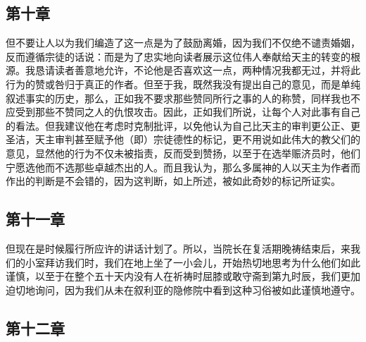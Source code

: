 
\subsection{第十章}

\par

但不要让人以为我们编造了这一点是为了鼓励离婚，因为我们不仅绝不谴责婚姻，反而遵循宗徒的话说：而是为了忠实地向读者展示这位伟人奉献给天主的转变的根源。我恳请读者善意地允许，不论他是否喜欢这一点，两种情况我都无过，并将此行为的赞或咎归于真正的作者。但至于我，既然我没有提出自己的意见，而是单纯叙述事实的历史，那么，正如我不要求那些赞同所行之事的人的称赞，同样我也不应受到那些不赞同之人的仇恨攻击。因此，正如我们所说，让每个人对此事有自己的看法。但我建议他在考虑时克制批评，以免他认为自己比天主的审判更公正、更圣洁，天主审判甚至赋予他（即）宗徒德性的标记，更不用说如此伟大的教父们的意见，显然他的行为不仅未被指责，反而受到赞扬，以至于在选举赈济员时，他们宁愿选他而不选那些卓越杰出的人。而且我认为，那么多属神的人以天主为作者而作出的判断是不会错的，因为这判断，如上所述，被如此奇妙的标记所证实。\par


\subsection{第十一章}

\par

但现在是时候履行所应许的讲话计划了。所以，当院长在复活期晚祷结束后，来我们的小室拜访我们时，我们在地上坐了一小会儿，开始热切地思考为什么他们如此谨慎，以至于在整个五十天内没有人在祈祷时屈膝或敢守斋到第九时辰，我们更加迫切地询问，因为我们从未在叙利亚的隐修院中看到这种习俗被如此谨慎地遵守。\par


\subsection{第十二章}

